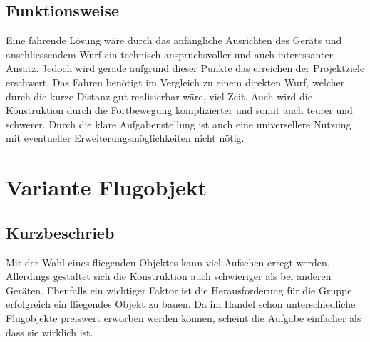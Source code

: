 \begin{landscape}
\subsection{Funktionsweise}
Eine fahrende Lösung wäre durch das anfängliche Ausrichten des Geräts und anschliessendem Wurf ein technisch anspruchsvoller und auch interessanter Ansatz. Jedoch wird gerade aufgrund dieser Punkte das erreichen der Projektziele erschwert. Das Fahren benötigt im Vergleich zu einem direkten Wurf, welcher durch die kurze Distanz gut realisierbar wäre, viel Zeit. Auch wird die Konstruktion durch die Fortbewegung komplizierter und somit auch teurer und schwerer. Durch die klare Aufgabenstellung ist auch eine universellere Nutzung mit eventueller Erweiterungsmöglichkeiten nicht nötig. 



\clearpage

\section{Variante Flugobjekt}
\subsection{Kurzbeschrieb}
Mit der Wahl eines fliegenden Objektes kann viel Aufsehen erregt werden. Allerdings gestaltet sich die Konstruktion auch schwieriger als bei anderen Geräten. Ebenfalls ein wichtiger Faktor ist die Herausforderung für die Gruppe erfolgreich ein fliegendes Objekt zu bauen. Da im Handel schon unterschiedliche Flugobjekte preiswert erworben werden können, scheint die Aufgabe einfacher als dass sie wirklich ist.


\end{landscape}

